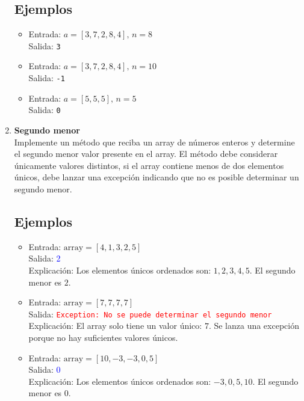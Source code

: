 \begin{enumerate}
     \subsection*{Ejemplos}
     \begin{itemize}
        \item Entrada: \( a = [3, 7, 2, 8, 4], \, n = 8 \)\\
        Salida: \texttt{3}
        
        \item Entrada: \( a = [3, 7, 2, 8, 4], \, n = 10 \)\\
        Salida: \texttt{-1}
        
        \item Entrada: \( a = [5, 5, 5], \, n = 5 \)\\
        Salida: \texttt{0}
    \end{itemize}
     
    \item \textbf{Segundo menor}\\
    Implemente un método que reciba un array de números enteros y determine el segundo menor valor presente en el array. El método debe considerar únicamente valores distintos, si el array contiene menos de dos elementos únicos, debe lanzar una excepción indicando que no es posible determinar un segundo menor.
    \subsection*{Ejemplos}
    \begin{itemize}
        \item Entrada: \( \text{array} = [4, 1, 3, 2, 5] \)\\
        Salida: \textcolor{blue}{2}\\
        Explicación: Los elementos únicos ordenados son: \(1, 2, 3, 4, 5\).
        El segundo menor es \( 2 \).
    
        \item Entrada: \( \text{array} = [7, 7, 7, 7] \)\\
        Salida: \textcolor{red}{\texttt{Exception: No se puede determinar el segundo menor}}\\
        Explicación: El array solo tiene un valor único: \(7\).
        Se lanza una excepción porque no hay suficientes valores únicos.
    
        \item Entrada: \( \text{array} = [10, -3, -3, 0, 5] \)\\
        Salida: \textcolor{blue}{0}\\
        Explicación: Los elementos únicos ordenados son: \(-3, 0, 5, 10\).
        El segundo menor es \( 0 \).
    

\end{itemize}
\end{enumerate}
